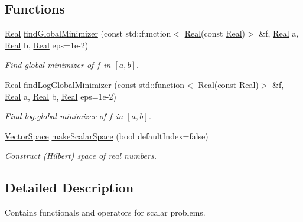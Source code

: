 \subsection*{\-Functions}
\begin{DoxyCompactItemize}
\item 
\hyperlink{classSpacy_1_1Real}{\-Real} \hyperlink{namespaceSpacy_1_1Scalar_ae3d9bbc5d6c84eafb70737dd8a96251c}{find\-Global\-Minimizer} (const std\-::function$<$ \hyperlink{classSpacy_1_1Real}{\-Real}(const \hyperlink{classSpacy_1_1Real}{\-Real})$>$ \&f, \hyperlink{classSpacy_1_1Real}{\-Real} a, \hyperlink{classSpacy_1_1Real}{\-Real} b, \hyperlink{classSpacy_1_1Real}{\-Real} eps=1e-\/2)
\begin{DoxyCompactList}\small\item\em \-Find global minimizer of $f$ in $[a,b]$. \end{DoxyCompactList}\item 
\hyperlink{classSpacy_1_1Real}{\-Real} \hyperlink{namespaceSpacy_1_1Scalar_a4692ea99ec81e957a20415d52659fd42}{find\-Log\-Global\-Minimizer} (const std\-::function$<$ \hyperlink{classSpacy_1_1Real}{\-Real}(const \hyperlink{classSpacy_1_1Real}{\-Real})$>$ \&f, \hyperlink{classSpacy_1_1Real}{\-Real} a, \hyperlink{classSpacy_1_1Real}{\-Real} b, \hyperlink{classSpacy_1_1Real}{\-Real} eps=1e-\/2)
\begin{DoxyCompactList}\small\item\em \-Find log.\-global minimizer of $f$ in $[a,b]$. \end{DoxyCompactList}\item 
\hyperlink{classSpacy_1_1VectorSpace}{\-Vector\-Space} \hyperlink{group__ScalarGroup_gaddea78d9bf47f78eedce719c2776d2d4}{make\-Scalar\-Space} (bool default\-Index=false)
\begin{DoxyCompactList}\small\item\em \-Construct (\-Hilbert) space of real numbers. \end{DoxyCompactList}\end{DoxyCompactItemize}


\subsection{\-Detailed \-Description}
\-Contains functionals and operators for scalar problems. 

